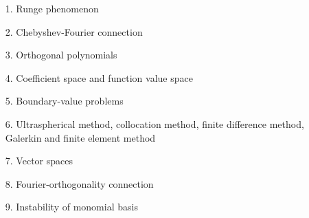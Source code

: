 \documentclass[12pt,a4paper]{article}
\begin{document}
\begin{itemize}
\item[1.  ] Runge phenomenon


\item[2.  ] Chebyshev-Fourier connection


\item[3.  ] Orthogonal polynomials


\item[4.  ] Coefficient space and function value space


\item[5.  ] Boundary-value problems


\item[6.  ] Ultraspherical method, collocation method, finite difference method, Galerkin and finite element method


\item[7.  ] Vector spaces


\item[8.  ] Fourier-orthogonality connection


\item[9.  ] Instability of monomial basis

\end{itemize}
\end{document}
